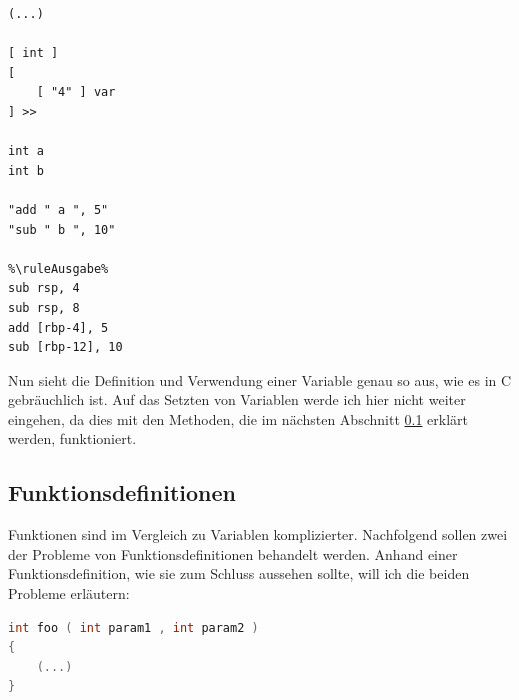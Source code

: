 \begin{lstlisting}[language=QHS, caption=Definition einer Variable mit {\selectListingFont int} \textit{Identifier}]
%\ruleEingabe%
(...)

[ int ] 
[
    [ "4" ] var
] >>
    
int a 
int b 
    
"add " a ", 5"
"sub " b ", 10"
        
%\ruleAusgabe%
sub rsp, 4
sub rsp, 8
add [rbp-4], 5
sub [rbp-12], 10
\end{lstlisting}

Nun sieht die Definition und Verwendung einer Variable genau so aus, wie es in C gebräuchlich ist.
Auf das Setzten von Variablen werde ich hier nicht weiter eingehen, da dies mit den Methoden, die im nächsten Abschnitt \ref{sec:qhs-funcs} erklärt werden, funktioniert.

\subsection{Funktionsdefinitionen} \label{sec:qhs-funcs}
Funktionen sind im Vergleich zu Variablen komplizierter. Nachfolgend sollen zwei der Probleme von Funktionsdefinitionen behandelt werden.
Anhand einer Funktionsdefinition, wie sie zum Schluss aussehen sollte, will ich die beiden Probleme erläutern:

\begin{lstlisting}[language=C, label=eg:qhs-function_goal, caption=Ziel für die Definition einer Funktion in QHS]
int foo ( int param1 , int param2 )
{
    (...)
}
\end{lstlisting}


